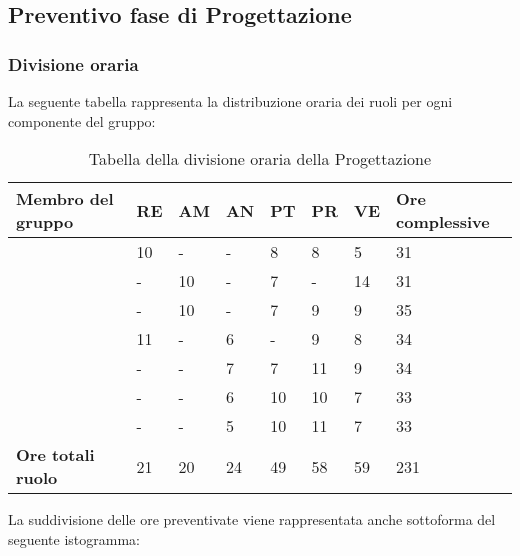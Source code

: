\subsection{Preventivo fase di Progettazione}

\subsubsection{Divisione oraria}
La seguente tabella rappresenta la distribuzione oraria dei ruoli per ogni componente del gruppo:
\renewcommand{\arraystretch}{2}
\begin{longtable}[h!] { C{4cm} C{1cm} C{1cm} C{1cm} C{1cm} C{1cm} C{1cm} C{3cm}}
\caption{Tabella della divisione oraria della Progettazione}\\
\rowcolor{\primaryColor}

\textcolor{\secondaryColor}{\textbf{Membro del gruppo}} & 
\textcolor{\secondaryColor}{\textbf{RE}} & 
\textcolor{\secondaryColor}{\textbf{AM}} & 
\textcolor{\secondaryColor}{\textbf{AN}} & 
\textcolor{\secondaryColor}{\textbf{PT}} & 
\textcolor{\secondaryColor}{\textbf{PR}} & 
\textcolor{\secondaryColor}{\textbf{VE}} & 
\textcolor{\secondaryColor}{\textbf{Ore complessive}}\\	
\endhead
        
\AW{}                     & 10  & - & - & 8 & 8 & 5 & 31 \\
\AT{}                     & -  & 10 & - & 7 & - & 14 & 31 \\
\AD{}                     & -  & 10 & - & 7 & 9 & 9 & 35 \\
\EC{}                     & 11  & - & 6 & - & 9 & 8 & 34 \\
\EM{}                     & -  & - & 7 & 7 & 11 & 9 & 34 \\
\FP{}                     & -  & - & 6 & 10 & 10 & 7 & 33 \\
\GG{}                     & -  & - & 5 & 10 & 11 & 7 & 33 \\
\textbf{Ore totali ruolo} & 21 & 20 & 24 & 49 & 58 & 59 & 231 \\

		
\end{longtable}
La suddivisione delle ore preventivate viene rappresentata anche sottoforma del seguente istogramma:

